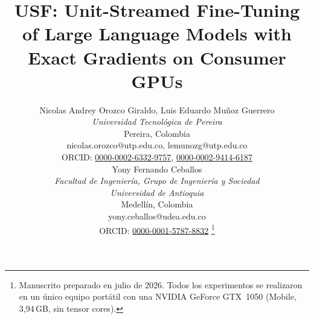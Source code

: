 \documentclass[journal]{IEEEtran}
\newcommand{\usf}{USF}
\begin{document}
\title{\usf{}: Unit-Streamed Fine-Tuning of Large Language Models with Exact Gradients on
Consumer GPUs}

\author{
Nicolas Andrey Orozco Giraldo, Luis Eduardo Muñoz Guerrero\\
\textit{Universidad Tecnológica de Pereira}\\
Pereira, Colombia\\
nicolas.orozco@utp.edu.co, lemunozg@utp.edu.co\\
ORCID: \href{https://orcid.org/0000-0002-6332-9757}{0000-0002-6332-9757},
\href{https://orcid.org/0000-0002-9414-6187}{0000-0002-9414-6187}\\[6pt]
Yony Fernando Ceballos\\
\textit{Facultad de Ingeniería, Grupo de Ingeniería y Sociedad}\\
\textit{Universidad de Antioquia}\\
Medellín, Colombia\\
yony.ceballos@udea.edu.co\\
ORCID: \href{https://orcid.org/0000-0001-5787-8832}{0000-0001-5787-8832}
\thanks{Manuscrito preparado en julio de 2026. Todos los experimentos se realizaron en un único
equipo portátil con una NVIDIA GeForce GTX~1050 (Mobile, 3,94\,GB, sin tensor cores).}}

\maketitle
\end{document}
